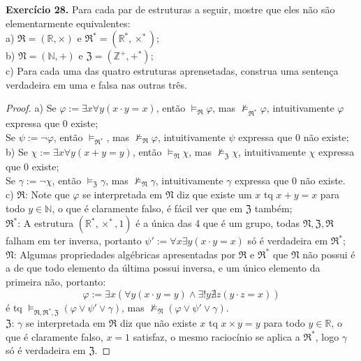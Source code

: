 \documentclass[11pt]{article}
\newcommand{\mf}[1]{\mathfrak{#1}}
\newcommand{\mbb}[1]{\mathbb{#1}}
\begin{document}
\begin{shaded}
\textbf{Exercício 28.} Para cada par de estruturas a seguir, mostre que eles não são elementarmente equivalentes:\\
a) $\mf{R}=(\mbb{R},\times)$ e $\mf{R}^*=(\mbb{R}^*,\times^*)$;\\
b) $\mf{N}=(\mbb{N},+)$ e $\mf{Z}=(\mbb{Z}^+,+^*)$;\\
c) Para cada uma das quatro estruturas aprensetadas, construa uma sentença verdadeira em uma e falsa nas outras três.
\end{shaded}

\begin{proof}
    a) Se $\varphi:=\exists x\forall y(x\cdot y=x)$, então $\vDash_\mf{R}\varphi$, mas $\nvDash_{\mf{R}^*}\varphi$, intuitivamente $\varphi$ expressa que $0$ existe;\\
    Se $\psi:=\neg\varphi$, então $\vDash_{\mf{R}^*}$, mas $\nvDash_{\mf{R}}\varphi$, intuitivamente $\psi$ expressa que $0$ não existe;\\
    b) Se $\chi:=\exists x\forall y(x + y = y)$, então $\vDash_\mf{N}\chi$, mas $\nvDash_\mf{Z}\chi$, intuitivamente $\chi$ expressa que 0 existe;\\
    Se $\gamma:=\neg\chi$, então $\vDash_\mf{Z}\gamma$, mas $\nvDash_\mf{N}\gamma$, intuitivamente $\gamma$ expressa que $0$ não existe.\\
    c) $\mf{R}$: Note que $\varphi$ se interpretada em $\mf{N}$ diz que existe um $x$ tq $x+y=x$ para todo $y\in\mbb{N}$, o que é claramente falso, é fácil ver que em $\mf{Z}$ também;\\
    $\mf{R}^*$: A estrutura $(\mbb{R}^*,\times^*,1)$ é a única das 4 que é um grupo, todas $\mf{N},\mf{Z},\mf{R}$ falham em ter inversa, portanto $\psi':=\forall x\exists y(x\cdot y=x)$ só é verdadeira em $\mf{R}^*$;\\
    $\mf{N}$: Algumas propriedades algébricas apresentadas por $\mf{R}$ e $\mf{R}^*$ que $\mf{N}$ não possui é a de que todo elemento da última possui inversa, e um único elemento da primeira não, portanto:
    $$\varphi := \exists x(\forall y(x\cdot y=y)\wedge\exists!y\nexists z(y\cdot z=x))$$
    é tq $\vDash_{\mf{R},\mf{R}^*,\mf{Z}}(\varphi\vee\psi'\vee\gamma)$, mas $\nvDash_\mf{N}(\varphi\vee\psi'\vee\gamma)$.\\
    $\mf{Z}$: $\gamma$ se interpretada em $\mf{R}$ diz que não existe $x$ tq $x\times y=y$ para todo $y\in\mbb{R}$, o que é claramente falso, $x=1$ satisfaz, o mesmo raciocínio se aplica a $\mf{R}^*$, logo $\gamma$ só é verdadeira em $\mf{Z}$.
\end{proof}
\end{document}
